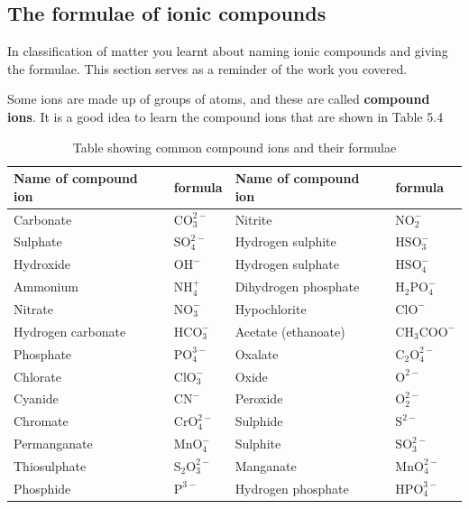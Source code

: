            \subsection{The formulae of ionic compounds}
            \nopagebreak
        \label{m38689*id144031}In classification of matter you learnt about naming ionic compounds and giving the formulae. This section serves as a reminder of the work you covered.\par 
        \label{m38689*id144050}Some ions are made up of groups of atoms, and these are called \textbf{compound ions}. It is a good idea to learn the compound ions that are shown in Table 5.4\par 
          \begin{table}[H]
        \begin{center}
      \label{m38689*uid99}
    \noindent
      \begin{tabular}{|l|l|l|l|}\hline
                  \textbf{Name of compound ion} &
                  \textbf{formula} &  \textbf{Name of compound ion} & \textbf{formula} \\ \hline
        Carbonate & $\mathrm{CO}_{3}^{2-}$ & Nitrite & $\mathrm{NO}_{2}^{-}$ \\ \hline
        Sulphate &  $\mathrm{SO}_{4}^{2-}$ & Hydrogen sulphite & $\mathrm{HSO}_{3}^{-}$ \\ \hline
        Hydroxide & ${\mathrm{OH}}^{-}$ & Hydrogen sulphate & $\mathrm{HSO}_{4}^{-}$ \\ \hline
        Ammonium & $\mathrm{NH}_{4}^{+}$ & Dihydrogen phosphate & ${\mathrm{H}}_{2}\mathrm{PO}_{4}^{-}$ \\ \hline
        Nitrate & $\mathrm{NO}_{3}^{-}$ & Hypochlorite & ${\mathrm{ClO}}^{-}$ \\ \hline
        Hydrogen carbonate & $\mathrm{HCO}_{3}^{-}$ & Acetate (ethanoate) & ${\mathrm{CH}}_{3}{\mathrm{COO}}^{-}$ \\ \hline
        Phosphate & $\mathrm{PO}_{4}^{3-}$ & Oxalate & ${\mathrm{C}}_{2}\mathrm{O}_{4}^{2-}$ \\ \hline
        Chlorate & $\mathrm{ClO}_{3}^{-}$ &  Oxide & ${\mathrm{O}}^{2-}$ \\ \hline
        Cyanide & ${\mathrm{CN}}^{-}$ & Peroxide & $\mathrm{O}_{2}^{2-}$ \\ \hline
        Chromate & $\mathrm{CrO}_{4}^{2-}$ & Sulphide & ${\mathrm{S}}^{2-}$ \\ \hline
        Permanganate & $\mathrm{MnO}_{4}^{-}$ & Sulphite & $\mathrm{SO}_{3}^{2-}$ \\ \hline
        Thiosulphate & ${\mathrm{S}}_{2}\mathrm{O}_{3}^{2-}$ & Manganate & $\mathrm{MnO}_{4}^{2-}$ \\ \hline
        Phosphide & ${\mathrm{P}}^{3-}$ & Hydrogen phosphate & $\mathrm{HPO}_{4}^{3-}$ \\ \hline
    \end{tabular}
      \end{center}
    \caption{Table showing common compound ions and their formulae}
\end{table}

